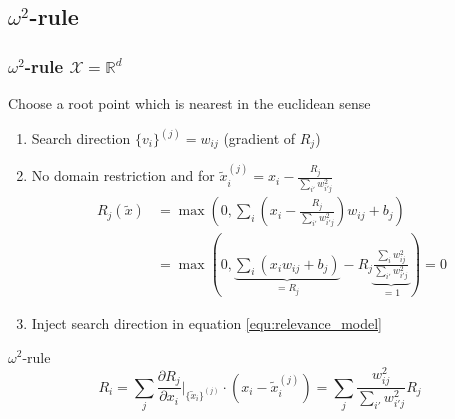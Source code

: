 \documentclass{beamer}
\begin{document}
\subsection[$\omega^2$-rule]{$\omega^2$-rule}


\begin{frame}
\frametitle{$\omega^2$-rule $\mathcal{X}=\mathbb{R}^d$}
\vspace{0.35cm}
Choose a root point which is nearest in the euclidean sense\\

\begin{enumerate}
	\item Search direction $\{v_i\}^{(j)} = w_{ij}$ (gradient of $R_j$)
	\item No domain restriction and for $\tilde{x}_i^{(j)} = x_i - \frac{R_j}{\sum_{i'}w_{i'j}^2}$
	\begin{align*}
		R_j(\tilde{x}) &= \max(0, \sum_i (x_i -\frac{R_j}{\sum_{i'}w_{i'j}^2}) w_{ij}  + b_j) \\
		&= \max(0, \underbrace{\sum_i (x_i w_{ij} + b_j)}_{=R_j} - R_j \underbrace{\frac{\sum_{i}w_{ij}^2}{\sum_{i'}w_{i'j}^2}}_{=1} )= 0 
	\end{align*}
	\vspace{-0.1cm}
	\item Inject search direction in equation \eqref{equ:relevance_model}
\end{enumerate}

\pause
\vspace{-0.15cm}
\begin{block}{$\omega^2$-rule}
\begin{equation*}
R_i =\sum_j\frac{\partial R_j}{\partial x_i}\Big|_{\{\tilde{x}_i\}^{(j)}} \cdot (x_i - \tilde{x}_i^{(j)}) =  \sum_j\frac{w_{ij}^2}{\sum_{i'} w_{i'j}^2} R_j
\end{equation*}
\end{block}



\end{frame}
\end{document}
